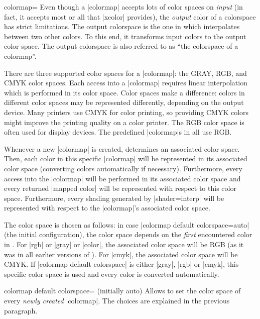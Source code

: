 \begin{pgfplotskey}{colormap=}
    Even though a |colormap| accepts lots of color spaces on \emph{input} (in
    fact, it accepts most or all that |xcolor| provides), the \emph{output}
    color of a colorspace has strict limitations. The output colorspace is the
    one in which \PGFPlots{} interpolates between two other colors. To this
    end, it transforms input colors to the output color space. The output
    colorspace is also referred to as ``the colorspace of a colormap''.

    There are three supported color spaces for a |colormap|: the GRAY, RGB, and
    CMYK color spaces. Each access into a |colormap| requires linear
    interpolation which is performed in its color space. Color spaces make a
    difference: colors in different color spaces may be represented
    differently, depending on the output device. Many printers use CMYK for
    color printing, so providing CMYK colors might improve the printing quality
    on a color printer. The RGB color space is often used for display devices.
    The predefined |colormap|s in \PGFPlots{} all use RGB.

    Whenever a new |colormap| is created, \PGFPlots{} determines an associated
    color space. Then, each color in this specific |colormap| will be
    represented in its associated color space (converting colors automatically
    if necessary). Furthermore, every access into the |colormap| will be
    performed in its associated color space and every returned |mapped color|
    will be represented with respect to this color space. Furthermore, every
    shading generated by |shader=interp| will be represented with respect to
    the |colormap|'s associated color space.

    The color space is chosen as follows: in case
    |colormap default colorspace=auto| (the initial configuration), the color
    space depends on the \emph{first} encountered color in . For |rgb| or |gray| or |color|, the associated color space
    will be RGB (as it was in all earlier versions of \PGFPlots{}). For |cmyk|,
    the associated color space will be CMYK. If |colormap default colorspace|
    is either |gray|, |rgb| or |cmyk|, this specific color space is used and
    every color is converted automatically.

    \begin{pgfplotskey}{colormap default colorspace= (initially auto)}
        Allows to set the color space of every \emph{newly created} |colormap|.
        The choices are explained in the previous paragraph.


\end{pgfplotskey}
\end{pgfplotskey}
